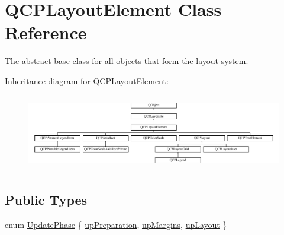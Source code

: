 \hypertarget{class_q_c_p_layout_element}{}\section{Q\+C\+P\+Layout\+Element Class Reference}
\label{class_q_c_p_layout_element}


The abstract base class for all objects that form the layout system.  


Inheritance diagram for Q\+C\+P\+Layout\+Element\+:\begin{figure}[H]
\begin{center}
\leavevmode
\includegraphics[height=3.376884cm]{class_q_c_p_layout_element}
\end{center}
\end{figure}
\subsection*{Public Types}
\begin{DoxyCompactItemize}
\item 
enum \hyperlink{class_q_c_p_layout_element_a0d83360e05735735aaf6d7983c56374d}{Update\+Phase} \{ \hyperlink{class_q_c_p_layout_element_a0d83360e05735735aaf6d7983c56374dad6119882eba136357c2f627992e527d3}{up\+Preparation}, 
\hyperlink{class_q_c_p_layout_element_a0d83360e05735735aaf6d7983c56374da288cb59a92280e47261a341f2813e676}{up\+Margins}, 
\hyperlink{class_q_c_p_layout_element_a0d83360e05735735aaf6d7983c56374da5d1ccf5d79967c232c3c511796860045}{up\+Layout}
 \}
\end{DoxyCompactItemize}
